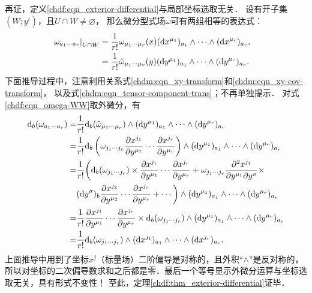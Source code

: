 再证，定义\eqref{chdf:eqn_exterior-differential}与局部坐标选取无关．
设有开子集$(W;y^i)$，且$U\cap W \neq \varnothing$，
那么微分型式场$\omega$可有两组相等的表达式：
\begin{align}
    \left. \omega_{a_{1}\cdots a_{r}} \right|_{U\cap W}
    &= \frac{1}{r!} \omega_{\mu_{1}\cdots \mu_{r}}(x)
    ({\rm d}x^{\mu_1})_{a_{1}} \wedge\cdots\wedge ({\rm d}x^{\mu_r})_{a_{r}} ,
      \quad  \label{chdf:eqn_omega-UU} \\
    &= \frac{1}{r!} \tilde{\omega}_{\mu_{1}\cdots \mu_{r}}(y)
    ({\rm d}y^{\mu_1})_{a_{1}} \wedge\cdots\wedge ({\rm d}y^{\mu_r})_{a_{r}} .
      \quad  \label{chdf:eqn_omega-WW}
\end{align}
下面推导过程中，注意利用关系式\eqref{chdm:eqn_xy-transform}和\eqref{chdm:eqn_xy-cov-transform}，
以及式\eqref{chdm:eqn_tensor-component-trans}；不再单独提示．
对式\eqref{chdf:eqn_omega-WW}取外微分，有
\begin{align*}
    {\rm d}_b ( \omega_{a_{1}\cdots a_{r}}) =&
       \frac{1}{r!} {\rm d}_b (\tilde{\omega}_{\mu_{1}\cdots \mu_{r}}) \wedge
      ({\rm d}y^{\mu_1})_{a_{1}} \wedge\cdots\wedge ({\rm d}y^{\mu_r})_{a_{r}}  \\
    =& \frac{1}{r!} {\rm d}_b \left( {\omega}_{j_1\cdots j_r}
    \frac{\partial x^{j_1}}{\partial y^{\mu_1}} \cdots
    \frac{\partial x^{j_r}}{\partial y^{\mu_r}} \right) \wedge
    ({\rm d}y^{\mu_1})_{a_{1}} \wedge\cdots\wedge ({\rm d}y^{\mu_r})_{a_{r}}  \\
    =& \frac{1}{r!} \biggl( {\rm d}_b ({\omega}_{j_1\cdots j_r} )
     \times \frac{\partial x^{j_1}}{\partial y^{\mu_1}} \cdots
    \frac{\partial x^{j_r}}{\partial y^{\mu_r}}
    +  {\omega}_{j_1\cdots j_r}
    \frac{\partial^2 x^{j_1}}{\partial y^{\mu_1} \partial y^{\sigma} } \times\\
    &({\rm d}y^{\sigma})_{b}
    \frac{\partial x^{j_2}}{\partial y^{\mu_2}} \cdots
    \frac{\partial x^{j_r}}{\partial y^{\mu_r}} + \cdots  \biggr) \wedge
    ({\rm d}y^{\mu_1})_{a_{1}} \wedge\cdots\wedge ({\rm d}y^{\mu_r})_{a_{r}}  \\
    =& \frac{1}{r!} \frac{\partial x^{j_1}}{\partial y^{\mu_1}} \cdots
    \frac{\partial x^{j_r}}{\partial y^{\mu_r}}  \times
     {\rm d}_b ({\omega}_{j_1\cdots j_r} ) \wedge
    ({\rm d}y^{\mu_1})_{a_{1}} \wedge\cdots\wedge ({\rm d}y^{\mu_r})_{a_{r}}  \\
    =& \frac{1}{r!}  {\rm d}_b (\omega_{j_{1}\cdots j_{r}})\wedge
    ({\rm d}x^{j_1})_{a_{1}} \wedge\cdots\wedge ({\rm d}x^{j_r})_{a_{r}} .
\end{align*}
上面推导中用到了坐标$x^j$（标量场）二阶偏导是对称的，且外积“$\wedge$”是反对称的，
所以对坐标的二次偏导数求和之后都是零．最后一个等号显示外微分运算与坐标选取无关，具有形式不变性！
至此，定理\ref{chdf:thm_exterior-differential}证毕． 

